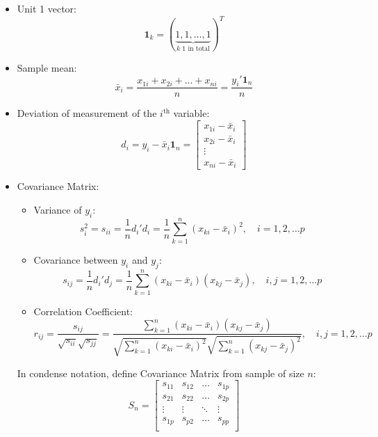     \begin{itemize}[topsep=6pt,itemsep=4pt]
        \item Unit 1 vector:
        \[
            \mathbf{1}_k=(\underbrace{1,1,\ldots,1}_{k\text{ 1 in total}})^T
        \]
        
        \item Sample mean:
        \[
            \bar{x}_i=\dfrac{x_{1i}+x_{2i}+\ldots+x_{ni}}{n}=\dfrac{y_i'\mathbf{1}_n}{n}
        \]
        
        \item Deviation of measurement of the $ i^\mathrm{th} $ variable:
        \[
            d_i=y_i-\bar{x}_i\mathbf{1}_n=\begin{bmatrix}
                x_{1i}-\bar{x}_i\\x_{2i}-\bar{x}_i\\\vdots\\x_{ni}-\bar{x}_i
            \end{bmatrix} 
        \]
        \item Covariance Matrix:
            \begin{itemize}[topsep=6pt,itemsep=4pt]      
            \item Variance of $ y_i $:
            \[
                s^2_i=s_{ii}=\dfrac{1}{n}d_i'd_i =\dfrac{1}{n}\sum_{k=1}^n (x_{ki}-\bar{x}_i)^2,\quad i=1,2,\ldots p
            \]
            \item Covariance between $ y_i $ and $ y_j $:
            \[
                s_{ij}=\dfrac{1}{n}d_i'd_j=\dfrac{1}{n}\sum_{k=1}^n(x_{ki}-\bar{x}_i)(x_{kj}-\bar{x}_j),\quad i,j=1,2,\ldots p
            \]
            \item Correlation Coefficient:
            \[
                r_{ij}=\dfrac{s_{ij}}{\sqrt{s_{ii}}\sqrt{s_{jj}}}=\dfrac{{\displaystyle\sum_{k=1}^n(x_{ki}-\bar{x}_i)(x_{kj}-\bar{x}_j)}}{\sqrt{{\displaystyle\sum_{k=1}^n(x_{ki}-\bar{x}_i)^2}}\sqrt{{\displaystyle\sum_{k=1}^n(x_{kj}-\bar{x}_j)^2}}},\quad i,j=1,2,\ldots p
            \]
            \end{itemize}
        
        In condense notation, define Covariance Matrix from sample of size $ n $:
        \[
            S_n=\begin{bmatrix}
            s_{11}&s_{12}&\ldots&s_{1p}\\
            s_{21}&s_{22}&\ldots&s_{2p}\\
            \vdots&\vdots&\ddots&\vdots\\
            s_{1p}&s_{p2}&\ldots&s_{pp}\\
            \end{bmatrix}
        \]


\end{itemize}

